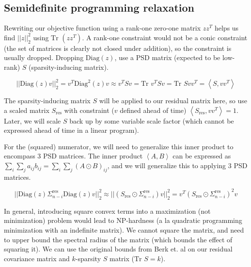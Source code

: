 \documentclass{article}
\begin{document}
\subsection{Semidefinite programming relaxation}

Rewriting our objective function using a rank-one zero-one matrix $z z^T$ helps us find $||z||_2^2$ using $\text{Tr }(z z^T)$. A rank-one constraint would not be a conic constraint (the set of matrices is clearly not closed under addition), so the constraint is usually dropped. Dropping $\text{Diag}(z)$, use a PSD matrix (expected to be low-rank) $S$ (sparsity-inducing matrix).

$$|| \text{Diag}(z) v ||_2^2 = v^T \text{Diag}^2(z) v
\approx
v^T S v
= \text{Tr } v^T S v = \text{Tr } S v v^T = \left< S, v v^T \right>
$$

The sparsity-inducing matrix $S$ will be applied to our residual matrix here, so use a scaled matrix $S_\text{res}$ with constraint ($v$ defined ahead of time) $\left< S_\text{res}, v v^T \right> = 1$. Later, we will scale $S$ back up by some variable scale factor (which cannot be expressed ahead of time in a linear program).

For the (squared) numerator, we will need to generalize this inner product to encompass 3 PSD matrices. The inner product $\left< A, B \right>$ can be expressed as $\sum_i \sum_j a_{ij} b_{ij} = \sum_i \sum_j (A \odot B)_{ij}$, and we will generalize this to applying 3 PSD matrices.

$$
|| \text{Diag}(z) \Sigma_{n-i}^\text{res} \text{Diag}(z) v ||_2^2
\approx
|| (S_\text{res} \odot \Sigma_{n-i}^\text{res}) v ||_2^2
= v^T (S_\text{res} \odot \Sigma_{n-i}^\text{res})^2 v
$$

In general, introducing square convex terms into a maximization (not minimization) problem would lead to NP-hardness (a la quadratic programming minimization with an indefinite matrix). We cannot square the matrix, and need to upper bound the spectral radius of the matrix (which bounds the effect of squaring it). We can use the original bounds from Berk et. al on our residual covariance matrix and $k$-sparsity $S$ matrix ($\text{Tr } S = k$).

\end{document}
